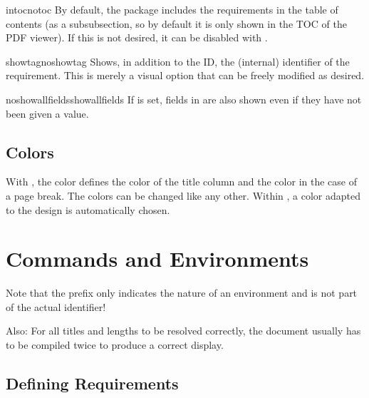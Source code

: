 \documentclass{sopra-base}
\begin{document}
\begin{argument}{intoc}{notoc}
    By default, the  package includes the requirements in the table of contents (as a subsubsection, so by default it is only shown in the TOC of the PDF viewer). If this is not desired, it can be disabled with .
\end{argument}

\begin{argument}{showtag}{noshowtag}
    Shows, in addition to the ID, the (internal) identifier of the requirement. This is merely a visual option that can be freely modified as desired.
\end{argument}

\begin{argument}{noshowallfields}{showallfields}
    If  is set, fields in  are also shown even if they have not been given a value.
\end{argument}

\subsection{Colors}

With , the color  defines the color of the title column and  the color in the case of a page break. The colors can be changed like any other. Within , a color adapted to the design is automatically chosen.


\section{Commands and Environments}

Note that the prefix  only indicates the nature of an environment and is not part of the actual identifier!\par{}
Also: For all titles and lengths to be resolved correctly, the document
usually has to be compiled twice to produce a correct display.

\subsection{Defining Requirements}
\end{document}
